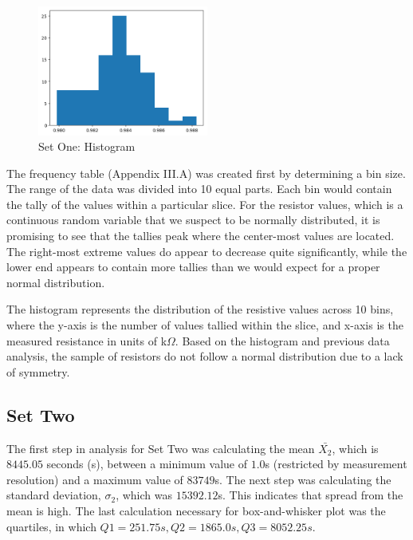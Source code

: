 \documentclass[10pt]{report}
\begin{document}
\begin{figure}
    \centering
    \includegraphics[width=0.50\textwidth]{results/resistor_histogram}
    \caption{Set One: Histogram}
\end{figure}



The frequency table (Appendix III.A) was created first by determining a bin size. The range of the data was
divided into 10 equal parts. Each bin would contain the tally of the values within
a particular slice. For the resistor values, which is a continuous random variable that we
suspect to be normally distributed, it is promising to see that the tallies peak where the center-most values are located. 
The right-most extreme values do appear to decrease quite significantly, while
the lower end appears to contain more tallies than we would expect for a proper normal distribution.

The histogram represents the distribution of the resistive values across 10 bins, where the y-axis 
is the number of values tallied within the slice, and x-axis is the measured resistance in units of k$\Omega$.
Based on the histogram and previous data analysis, the sample of resistors do not follow a
normal distribution due to a lack of symmetry.



\subsection*{Set Two}

The first step in analysis for Set Two was calculating the mean $\bar{X_2}$, which is $8445.05$ seconds (s),
between a minimum value of $1.0$s (restricted by measurement resolution) and a maximum value of $83749$s. 
The next step was calculating the standard deviation, $\sigma_2$, which was $15392.12$s. 
This indicates that spread from the mean is high. The last calculation necessary for box-and-whisker plot was the quartiles,
in which $Q1 = 251.75s, Q2 = 1865.0s, Q3 = 8052.25s$.
\end{document}
